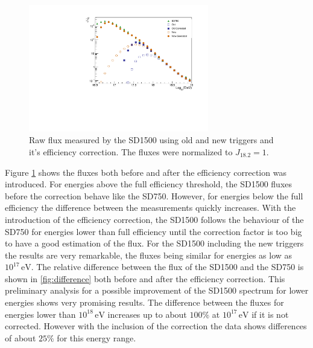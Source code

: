 \documentclass[12pt,a4paper]{article}
\newcommand{\eV}{\, \mathrm{eV}}
\begin{document}
\begin{figure}[h]
    \begin{center}
        \includegraphics[width=0.7\textwidth]{plots/spectrum.pdf}
        \caption{Raw flux measured by the SD1500 using old and new triggers and it's efficiency correction. The fluxes were normalized to $J_{18.2}=1$.
        \label{fig:flux}}
        \vspace{-0.5 cm}
    \end{center}
\end{figure}

Figure \ref{fig:flux} shows the fluxes both before and after the efficiency correction was introduced. For energies above the full efficiency threshold, the SD1500 fluxes before the correction behave like the SD750. However, for energies below the full efficiency the difference between the measurements quickly increases. With the introduction of the efficiency correction, the SD1500 follows the behaviour of the SD750 for energies lower than full efficiency until the correction factor is too big to have a good estimation of the flux.
For the SD1500 including the new triggers the results are very remarkable, the fluxes being similar for energies as low as $10^17{\eV}$. The relative difference between the flux of the SD1500 and the SD750 is shown in \cref{fig:difference} both before and after the efficiency correction. This preliminary analysis for a possible improvement of the SD1500 spectrum for lower energies shows very promising results. The difference between the fluxes for energies lower than $10^{18}\eV$ increases up to about $100\%$ at $10^{17}\eV$ if it is not corrected. However with the inclusion of the correction the data shows differences of about $25\%$ for this energy range. 
\end{document}
